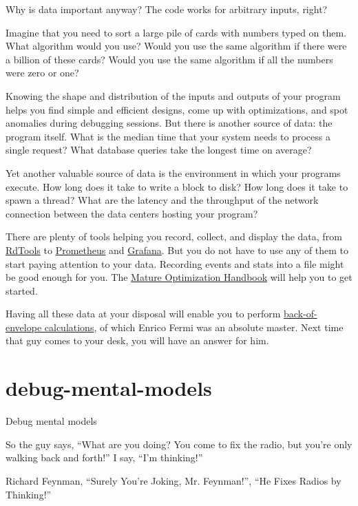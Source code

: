 \documentclass{article}
\begin{document}
Why is data important anyway?
The code works for arbitrary inputs, right?

Imagine that you need to sort a large pile of cards with numbers typed on them.
What algorithm would you use?
Would you use the same algorithm if there were a billion of these cards?
Would you use the same algorithm if all the numbers were zero or one?

Knowing the shape and distribution of the inputs and outputs of your program helps you find simple and efficient designs, come up with optimizations, and spot anomalies during debugging sessions.
But there is another source of data: the program itself.
What is the median time that your system needs to process a single request?
What database queries take the longest time on average?

Yet another valuable source of data is the environment in which your programs execute.
How long does it take to write a block to disk?
How long does it take to spawn a thread?
What are the latency and the throughput of the network connection between the data centers hosting your program?

There are plenty of tools helping you record, collect, and display the data, from \href{https://rdtools.readthedocs.io/en/stable/}{RdTools} to \href{https://prometheus.io/}{Prometheus} and \href{https://grafana.com/}{Grafana}.
But you do not have to use any of them to start paying attention to your data.
Recording events and stats into a file might be good enough for you.
The \href{https://carlos.bueno.org/optimization/}{Mature Optimization Handbook} will help you to get started.

Having all these data at your disposal will enable you to perform \href{https://en.wikipedia.org/wiki/Back-of-the-envelope_calculation}{back-of-envelope calculations}, of which Enrico Fermi was an absolute master.
Next time that  guy comes to your desk, you will have an answer for him.

\section{debug-mental-models}{Debug mental models}

\epigraph{
    So the guy says, ``What are you doing? You come to fix the radio, but you're only walking back and forth!''
    I say, ``I'm thinking!''
}{Richard Feynman, ``Surely You're Joking, Mr. Feynman!'', ``He Fixes Radios by Thinking!''}
\end{document}
